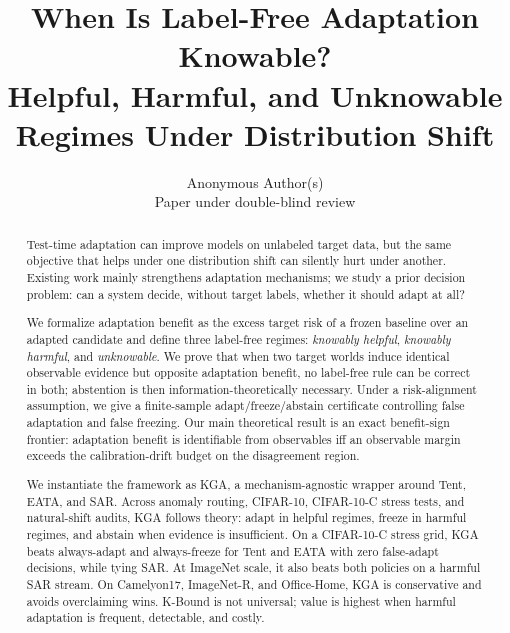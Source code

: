\documentclass[11pt]{article}
\title{\textbf{When Is Label-Free Adaptation Knowable?}\\[2pt]
\large Helpful, Harmful, and Unknowable Regimes Under Distribution Shift}
\author{Anonymous Author(s)\\ \small Paper under double-blind review}
\date{}
\theoremstyle{plain}
\theoremstyle{definition}
\begin{document}
\maketitle

\begin{abstract}
Test-time adaptation can improve models on unlabeled target data, but the same
objective that helps under one distribution shift can silently hurt under another.
Existing work mainly strengthens adaptation mechanisms; we study a prior decision
problem: can a system decide, without target labels, whether it should adapt at all?

We formalize adaptation benefit as the excess target risk of a frozen baseline over
an adapted candidate and define three label-free regimes: \emph{knowably helpful},
\emph{knowably harmful}, and \emph{unknowable}. We prove that when two target worlds
induce identical observable evidence but opposite adaptation benefit, no label-free
rule can be correct in both; abstention is then information-theoretically necessary.
Under a risk-alignment assumption, we give a finite-sample adapt/freeze/abstain
certificate controlling false adaptation and false freezing. Our main theoretical
result is an exact benefit-sign frontier: adaptation benefit is identifiable from
observables iff an observable margin exceeds the calibration-drift budget on the
disagreement region.

We instantiate the framework as \textsc{KGA}, a mechanism-agnostic wrapper around
Tent, EATA, and SAR. Across anomaly routing, CIFAR-10, CIFAR-10-C stress tests, and
natural-shift audits, \textsc{KGA} follows theory: adapt in helpful regimes, freeze
in harmful regimes, and abstain when evidence is insufficient. On a CIFAR-10-C stress grid,
\textsc{KGA} beats always-adapt and always-freeze for Tent and EATA with zero
false-adapt decisions, while tying SAR. At ImageNet scale, it also beats both
policies on a harmful SAR stream. On Camelyon17, ImageNet-R, and Office-Home,
\textsc{KGA} is conservative and avoids overclaiming wins. K-Bound is not universal;
value is highest when harmful adaptation is frequent, detectable, and costly.
\end{abstract}

\begin{center}\end{center}
\end{document}
